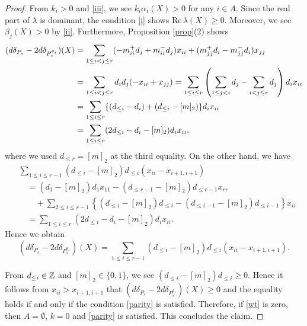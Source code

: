 \documentclass[11pt,letterpaper]{amsart}
\renewcommand{\a}{\alpha}
\renewcommand{\l}{\lambda}
\def\d{\delta}
\renewcommand{\Re}{{\mathrm{Re}\,}}
\theoremstyle{plain}
\numberwithin{equation}{section}
\begin{document}
\begin{proof}
From $k_i>0$ and \eqref{iii}, we see $k_i\a_i(X)>0$ for any $i\in A$. 
Since the real part of $\l$ is dominant, the condition \eqref{i} shows $\Re\l(X)\ge 0$.
Moreover, we see $\beta_j(X)>0$ by \eqref{ii}. 
Furthermore, Proposition \ref{prop}(2) shows 
    \begin{align}\label{d}
    (d\d_{P_s}-2d\d_{P_s^{\theta_s}})(X)
    & =\sum_{1\le i<j\le r}(-m_{ii}^+d_j+m_{ii}^-d_j)x_{ii}
    +(m_{jj}^+d_i-m_{jj}^-d_i)x_{jj}\\ \notag
    & =\sum_{1\le i<j\le r}d_id_j(-x_{ii}+x_{jj}) =
    \sum_{1\le i\le r}\left(\sum_{1\le j<i}d_j-\sum_{i<j\le r}d_j\right)d_ix_{ii} \\
    \notag
    & =\sum_{1\le i\le r} \{(d_{\le i}-d_i )+(d_{\le i}-[m]_2) \}d_ix_{ii}  \\ \notag
    & =\sum_{1\le i\le r} (2d_{\le i}-d_i -[m]_2)d_ix_{ii},
    \end{align}
where we used $d_{\le r}=[m]_2$ at the third equality. 
On the other hand,  we have
    \begin{align*}
    & \sum_{1\le i\le r-1}\left(d_{\le i}-[m]_2\right)d_{\le i}(x_{ii}-x_{i+1,i+1}) \\
    & \quad = (d_1-[m]_2)d_1x_{11} - \left(d_{\le r-1}-[m]_2\right)d_{\le r-1}x_{rr} \\
    &\qquad+ \sum_{2\leq i\leq r-1} \left\{\left(d_{\le i}-[m]_2\right)d_{\le i} 
    - \left(d_{\le i-1}-[m]_2\right)d_{\le i-1} \right\}x_{ii} \\
    & \quad = \sum_{1\le i\le r} (2d_{\le i}-d_i -[m]_2)d_ix_{ii}.
    \end{align*}
Hence we obtain
    \[
    (d\d_{P_s}-2d\d_{P_s^{\theta_s}})(X) 
    = \sum_{1\leq i\leq r-1}\left(d_{\le i}-[m]_2\right)d_{\leq i}(x_{ii}-x_{i+1,i+1}).
    \]

From $d_{\le i}\in{\mathbb {Z}}$ and $[m]_2\in\{0,1\}$, we see 
$\left(d_{\le i}-[m]_2\right)d_{\le i}\ge 0$. 
Hence it follows from $x_{ii}> x_{i+1,i+1}$ that $(d\d_{P_s}-2d\d_{P_s^{\theta_s}})(X)\ge 0$ and the equality holds if and only if the condition \eqref{parity} is satisfied. 
Therefore,  if \eqref{wt} is zero,  then $A=\emptyset$,  $k=0$ and \eqref{parity} is satisfied.
This concludes the claim. 
\end{proof}
\end{document}
